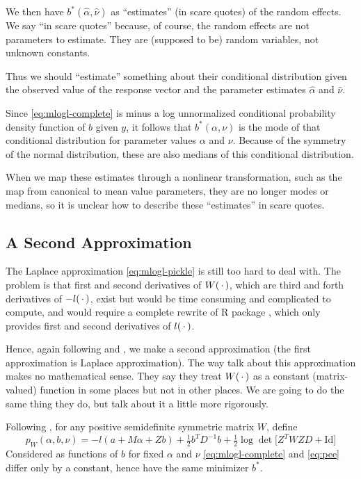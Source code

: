 We then have $b^*(\hat{\alpha}, \hat{\nu})$ as ``estimates'' (in scare quotes)
of the random effects.  We say ``in scare quotes'' because, of course, the
random effects are not parameters to estimate.  They are (supposed to be)
random variables, not unknown constants.

Thus we should ``estimate'' something about their conditional distribution
given the observed value of the response vector and the parameter estimates
$\hat{\alpha}$ and $\hat{\nu}$.

Since \eqref{eq:mlogl-complete} is minus a log unnormalized
conditional probability density function of $b$ given $y$, it follows
that $b^*(\alpha, \nu)$ is the mode of that conditional distribution
for parameter values $\alpha$ and $\nu$.
Because of the symmetry of the normal distribution, these are also medians
of this conditional distribution.

When we map these estimates through a nonlinear transformation, such as the
map from canonical to mean value parameters,
they are no longer modes or medians, so it is unclear how to describe these
``estimates'' in scare quotes.

\subsection{A Second Approximation}
\label{sec:second-approximation}

The Laplace approximation \eqref{eq:mlogl-pickle} is still too hard to
deal with.  The problem is that first and second derivatives of $W(\,\cdot\,)$,
which are third and forth derivatives of $- l(\,\cdot\,)$, exist but would be
time consuming and complicated to compute, and would require a complete
rewrite of R package , which only provides first and second
derivatives of $l(\,\cdot\,)$.

Hence, again following \citet{breslow-clayton} and \citet{reaster}, we
make a second approximation (the first approximation is Laplace approximation).
The way \citet{reaster} talk about this approximation makes no mathematical
sense.  They say they treat $W(\,\cdot\,)$ as a constant (matrix-valued) function
in some places but not in other places.  We are going to do the same thing
they do, but talk about it a little more rigorously.

Following \citet{reaster},
for any positive semidefinite symmetric matrix $W$, define
\begin{equation} \label{eq:pee}
   p_W(\alpha, b, \nu) =
   - l(a + M \alpha + Z b) + \tfrac{1}{2} b^T D^{-1} b
   + \tfrac{1}{2} \log \det \bigl[ Z^T W Z D + \text{Id}
   \bigr]
\end{equation}
Considered as functions of $b$ for fixed $\alpha$ and $\nu$
\eqref{eq:mlogl-complete} and \eqref{eq:pee} differ only by a constant,
hence have the same minimizer $b^*$.

